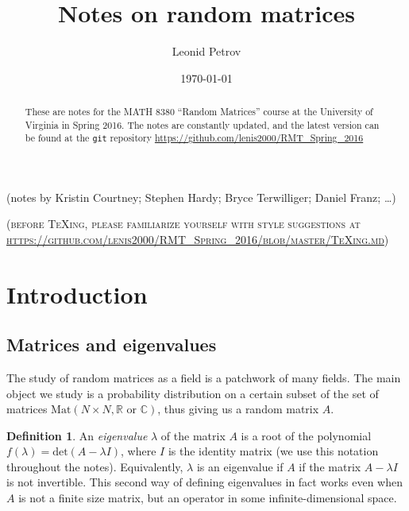 \documentclass[letterpaper,11pt,oneside,reqno]{amsart}
\numberwithin{equation}{section}
\newcommand{\note}[1]{\textsc{\color{blue}(#1)}}
\newcounter{lecture}
\newcommand{\lect}[1]{\bigskip\addtocounter{lecture}{1}\noindent{\Large{\color{red}\bf{}Lecture \#\arabic{lecture} on #1 \hrulefill}}}
\theoremstyle{definition}
\newtheorem{definition}[proposition]{Definition}
\begin{document}
\title[Notes on random matrices]{Notes on random matrices}

\author[L. Petrov]{Leonid Petrov}
\date{\today}
\maketitle

\begin{center}
	(notes by 
	Kristin Courtney;
	Stephen Hardy;
	Bryce Terwilliger;
	Daniel Franz; \ldots)
\end{center}

\begin{abstract}
	These are notes for the MATH 8380 ``Random Matrices'' course at the
	University of Virginia in Spring 2016. The notes are constantly updated,
	and the latest version can be found at the \texttt{git} repository
	\url{https://github.com/lenis2000/RMT_Spring_2016}
\end{abstract}

\bigskip

\begin{center}
\noindent\note{before \TeX{}ing, please familiarize yourself with style suggestions at\\
\url{https://github.com/lenis2000/RMT_Spring_2016/blob/master/TeXing.md}}
\end{center}
\bigskip

\setcounter{tocdepth}{1}
\tableofcontents
\setcounter{tocdepth}{3}

\lect{1/20/2016}

\section{Introduction} %
\label{sec:introduction}

\subsection{Matrices and eigenvalues} %
\label{sub:object_of_study}

The study of random matrices as a field is a patchwork of many fields.  The
main object we study is a probability distribution on a certain subset of the
set of matrices $\mathrm{Mat}(N\times N,\mathbb R \text{ or } \mathbb C)$,
thus giving us a random matrix $A$.

\begin{definition}
An {\it eigenvalue} $\lambda$ of the matrix $A$ is a root of the polynomial
$f(\lambda)=\text{det}(A-\lambda I)$, where $I$ is the identity matrix 
(we use this notation throughout the notes).  
Equivalently, $\lambda$ is an
eigenvalue if $A$ if the matrix $A-\lambda I$ is not invertible. This second
way of defining eigenvalues in fact works even when $A$ is not a finite
size matrix, but an operator in some infinite-dimensional space.
\end{definition}
\end{document}
